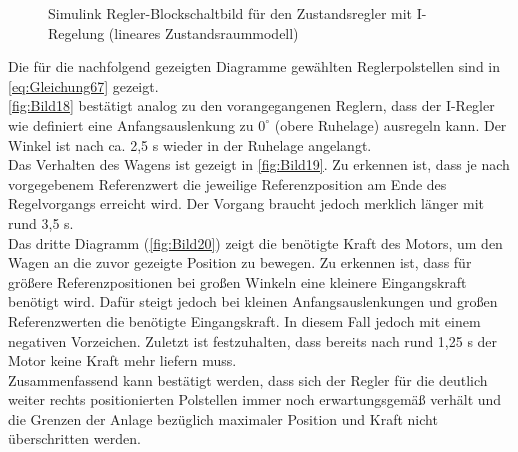 \documentclass[
	pagesize,
	fontsize=12pt,
	paper=a4,
	oneside,
   reqno
]{scrartcl}
\newcommand{\ca}{ca.\xspace}
\begin{document}
\begin{figure}[H]
    \centering
    \caption[Regler mit I-Regelung Simulink (linear)]{Simulink Regler-Blockschaltbild für den Zustandsregler mit I-Regelung (lineares Zustandsraummodell)}
    \label{fig:Bild17.5}
\end{figure}

Die für die nachfolgend gezeigten Diagramme gewählten Reglerpolstellen sind in \autoref{eq:Gleichung67} gezeigt. \\
\newline
\autoref{fig:Bild18} bestätigt analog zu den vorangegangenen Reglern, dass der I-Regler wie definiert eine Anfangsauslenkung zu $0^\circ$ (obere Ruhelage) ausregeln kann. Der Winkel ist nach \ca 2,5 s wieder in der Ruhelage angelangt. \\
\newline
Das Verhalten des Wagens ist gezeigt in \autoref{fig:Bild19}. Zu erkennen ist, dass je nach vorgegebenem Referenzwert die jeweilige Referenzposition am Ende des Regelvorgangs erreicht wird. Der Vorgang braucht jedoch merklich länger mit rund 3,5 s. \\
\newline
Das dritte Diagramm (\autoref{fig:Bild20}) zeigt die benötigte Kraft des Motors, um den Wagen an die zuvor gezeigte Position zu bewegen. Zu erkennen ist, dass für größere Referenzpositionen bei großen Winkeln eine kleinere Eingangskraft benötigt wird. Dafür steigt jedoch bei kleinen Anfangsauslenkungen und großen Referenzwerten die benötigte Eingangskraft. In diesem Fall jedoch mit einem negativen Vorzeichen. Zuletzt ist festzuhalten, dass bereits nach rund 1,25 s der Motor keine Kraft mehr liefern muss.\\
\newline
Zusammenfassend kann bestätigt werden, dass sich der Regler für die deutlich weiter rechts positionierten Polstellen immer noch erwartungsgemäß verhält und die Grenzen der Anlage bezüglich maximaler Position und Kraft nicht überschritten werden.
\end{document}
